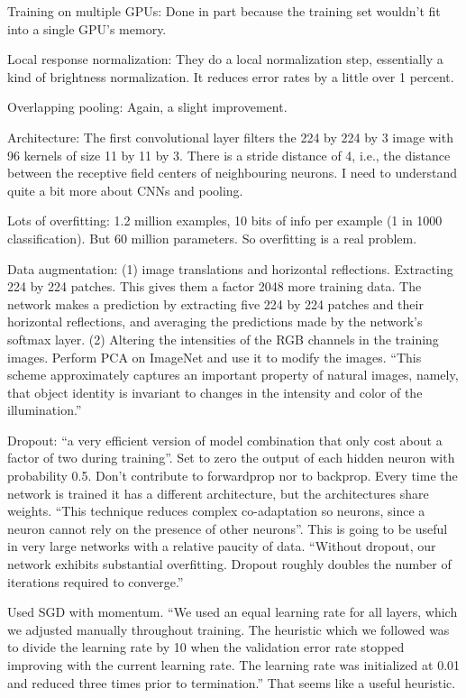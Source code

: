 \documentclass[12pt]{article}
\begin{document}
Training on multiple GPUs: Done in part because the training set
wouldn't fit into a single GPU's memory.

Local response normalization: They do a local normalization step,
essentially a kind of brightness normalization.  It reduces error
rates by a little over 1 percent.

Overlapping pooling: Again, a slight improvement.

Architecture: The first convolutional layer filters the 224 by 224 by
3 image with 96 kernels of size 11 by 11 by 3.  There is a stride
distance of 4, i.e., the distance between the receptive field centers
of neighbouring neurons.  I need to understand quite a bit more about
CNNs and pooling.

Lots of overfitting: 1.2 million examples, 10 bits of info per example
(1 in 1000 classification).  But 60 million parameters.  So
overfitting is a real problem.

Data augmentation: (1) image translations and horizontal reflections.
Extracting 224 by 224 patches.  This gives them a factor 2048 more
training data.  The network makes a prediction by extracting five 224
by 224 patches and their horizontal reflections, and averaging the
predictions made by the network's softmax layer. (2) Altering the
intensities of the RGB channels in the training images.  Perform PCA
on ImageNet and use it to modify the images.  ``This scheme
approximately captures an important property of natural images,
namely, that object identity is invariant to changes in the intensity
and color of the illumination.'' 

Dropout: ``a very efficient version of model combination that only
cost about a factor of two during training''.  Set to zero the output
of each hidden neuron with probability 0.5.  Don't contribute to
forwardprop nor to backprop.  Every time the network is trained it has
a different architecture, but the architectures share weights.  ``This
technique reduces complex co-adaptation so neurons, since a neuron
cannot rely on the presence of other neurons''.  This is going to be
useful in very large networks with a relative paucity of data.
``Without dropout, our network exhibits substantial overfitting.
Dropout roughly doubles the number of iterations required to
converge.''

Used SGD with momentum.  ``We used an equal learning rate for all
layers, which we adjusted manually throughout training.  The heuristic
which we followed was to divide the learning rate by 10 when the
validation error rate stopped improving with the current learning
rate.  The learning rate was initialized at 0.01 and reduced three
times prior to termination.''   That seems like a useful heuristic.
\end{document}
